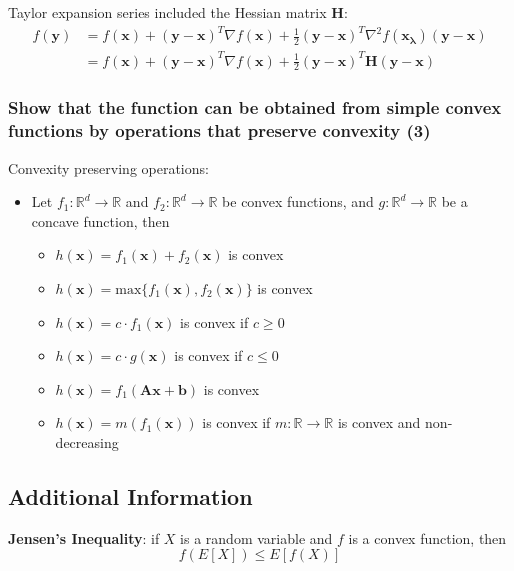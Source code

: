 \documentclass[a4paper,10pt,twoside=true,DIV=10,headsepline,plainheadsepline]{scrartcl}
\begin{document}
		Taylor expansion series included the Hessian matrix $\mathbf{H}$:
			\begin{align} 
				f(\mathbf{y}) &= f(\mathbf{x}) + (\mathbf{y} - \mathbf{x})^T \nabla f(\mathbf{x}) + \frac{1}{2} (\mathbf{y} - \mathbf{x})^T \nabla^2 f(\mathbf{x_{\lambda}}) (\mathbf{y} - \mathbf{x}) \\
			&= f(\mathbf{x}) + (\mathbf{y} - \mathbf{x})^T \nabla f(\mathbf{x}) + \frac{1}{2} (\mathbf{y} - \mathbf{x})^T \mathbf{H} (\mathbf{y} - \mathbf{x})
			\end{align}
			\newline


		\subsubsection{Show that the function can be obtained from simple convex functions by operations that preserve convexity (3)}

			Convexity preserving operations:
			
			\begin{itemize}
				\item Let $f_1 : \mathbb{R}^d \rightarrow \mathbb{R}$ and $f_2 : \mathbb{R}^d \rightarrow \mathbb{R}$ be convex functions, and $g : \mathbb{R}^d \rightarrow \mathbb{R}$ be a concave function, then
				\begin{itemize}
 					\item $h(\mathbf{x}) = f_1(\mathbf{x}) + f_2(\mathbf{x})$ is convex
					\item $h(\mathbf{x}) = \textrm{max}\{f_1(\mathbf{x}), f_2(\mathbf{x})\}$ is convex
					\item $h(\mathbf{x}) = c \cdot f_1(\mathbf{x})$ is convex if $c \geq 0$
					\item $h(\mathbf{x}) = c \cdot g(\mathbf{x})$ is convex if $c \leq 0$
					\item $h(\mathbf{x}) = f_1(\mathbf{A} \mathbf{x} + \mathbf{b})$ is convex
					\item $h(\mathbf{x}) = m(f_1(\mathbf{x}))$ is convex if $m: \mathbb{R} \rightarrow \mathbb{R}$ is convex and non-decreasing
				\end{itemize}
			\end{itemize}

		\subsection{Additional Information}

			\textbf{Jensen's Inequality}: if $X$ is a random variable and $f$ is a convex function, then 
			\begin{equation}
				f ( E[X] ) \le E [f(X)]
			\end{equation}
			\newline
\end{document}
